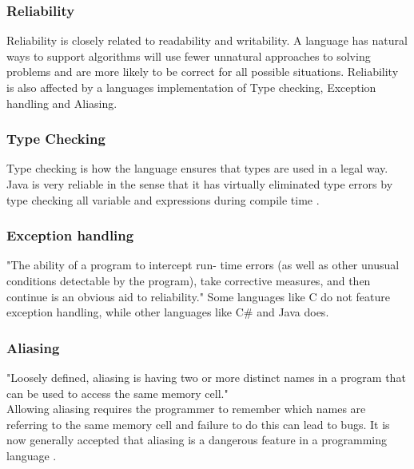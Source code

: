 \subsubsection*{Reliability}
Reliability is closely related to readability and writability. A language has natural ways to support algorithms will use fewer unnatural approaches to solving problems and are more likely to be correct for all possible situations.
Reliability is also affected by a languages implementation of Type checking, Exception handling and Aliasing. 
\subsubsection*{Type Checking}
Type checking is how the language ensures that types are used in a legal way. Java is very reliable in the sense that it has virtually eliminated type errors by type checking all variable and expressions during compile time .
\subsubsection*{Exception handling}
"The ability of a program to intercept run- time errors (as well as other
unusual conditions detectable by the program), take corrective measures, and
then continue is an obvious aid to reliability."
Some languages like C do not feature exception handling, while other languages like C\# and Java does. 
\subsubsection*{Aliasing}
"Loosely defined, aliasing is having two or more distinct names in a program that can be used to access the same memory cell." \\
Allowing aliasing requires the programmer to remember which names are referring to the same memory cell and failure to do this can lead to bugs.  It is now generally accepted
that aliasing is a dangerous feature in a programming language .




